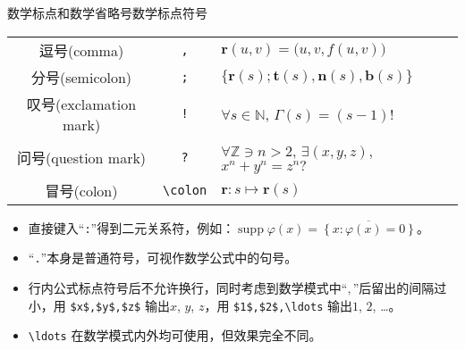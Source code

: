 \documentclass[mathserif]{beamer}
\newcommand{\integer}{\mathbb Z}
\newcommand{\natura}{\mathbb N}
\begin{document}
\begin{frame}[fragile]{数学标点和数学省略号}{数学标点符号}
\begin{table}[H]
\centering
\begin{tabular}{c|c|l}
	\toprule
	逗号(comma) & \lstinline',' & $\bm{r}(u, v) = \big( u, v, f(u, v) \big)$ \\
	分号(semicolon) & \lstinline';' & $\big\{ \bm{r}(s); \bm{t}(s), \bm{n}(s), \bm{b}(s) \big\}$ \\
	叹号(exclamation mark) & \lstinline'!' & $\forall s \in \natura$, $\Gamma(s) = (s-1)!$ \\
	问号(question mark) & \lstinline'?' & $\forall \integer \owns n > 2$, $\exists (x, y, z)$, $x^{n} + y^{n} = z^{n}?$ \\
	冒号(colon) & \lstinline'\colon' & $\bm{r} \colon s \mapsto \bm{r}(s)$ \\
	\bottomrule
\end{tabular}
\end{table}
\begin{itemize}

\item 直接键入``\lstinline':'''得到二元关系符，例如：$\operatorname{supp} \varphi(x) = \overline{\left\{ x : \varphi(x) = 0 \right\}}$。


\item ``\lstinline'.'''本身是普通符号，可视作数学公式中的句号。

\item 行内公式标点符号后不允许换行，同时考虑到数学模式中``$,$''后留出的间隔过小，用 \lstinline'$x$,'\textvisiblespace\lstinline'$y$,'\textvisiblespace\lstinline'$z$' 输出$x$, $y$, $z$，用 \lstinline'$1$,'\textvisiblespace\lstinline'$2$,'\textvisiblespace\lstinline'\ldots' 输出$1$, $2$, \ldots。

\item \lstinline'\ldots' 在数学模式内外均可使用，但效果完全不同。

\end{itemize}
\end{frame}
\end{document}
